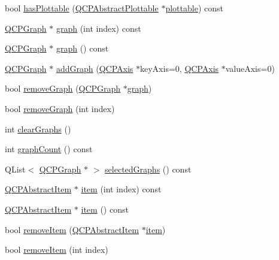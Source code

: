 \begin{DoxyCompactItemize}
\item 
bool \hyperlink{class_q_custom_plot_a72cefbfbb9e699940e37be605bd9c51e}{has\+Plottable} (\hyperlink{class_q_c_p_abstract_plottable}{Q\+C\+P\+Abstract\+Plottable} $\ast$\hyperlink{class_q_custom_plot_a32de81ff53e263e785b83b52ecd99d6f}{plottable}) const
\item 
\hyperlink{class_q_c_p_graph}{Q\+C\+P\+Graph} $\ast$ \hyperlink{class_q_custom_plot_a6ecae130f684b25276fb47bd3a5875c6}{graph} (int index) const
\item 
\hyperlink{class_q_c_p_graph}{Q\+C\+P\+Graph} $\ast$ \hyperlink{class_q_custom_plot_aac190865a67f19af3fdf2136774997af}{graph} () const
\item 
\hyperlink{class_q_c_p_graph}{Q\+C\+P\+Graph} $\ast$ \hyperlink{class_q_custom_plot_a6fb2873d35a8a8089842d81a70a54167}{add\+Graph} (\hyperlink{class_q_c_p_axis}{Q\+C\+P\+Axis} $\ast$key\+Axis=0, \hyperlink{class_q_c_p_axis}{Q\+C\+P\+Axis} $\ast$value\+Axis=0)
\item 
bool \hyperlink{class_q_custom_plot_a903561be895fb6528a770d66ac5e6713}{remove\+Graph} (\hyperlink{class_q_c_p_graph}{Q\+C\+P\+Graph} $\ast$\hyperlink{class_q_custom_plot_a6ecae130f684b25276fb47bd3a5875c6}{graph})
\item 
bool \hyperlink{class_q_custom_plot_a9554b3d2d5b10c0f884bd4010b6c192c}{remove\+Graph} (int index)
\item 
int \hyperlink{class_q_custom_plot_ab0f3abff2d2f7df3668b5836f39207fa}{clear\+Graphs} ()
\item 
int \hyperlink{class_q_custom_plot_a5e1787cdde868c4d3790f9ebc8207d90}{graph\+Count} () const
\item 
Q\+List$<$ \hyperlink{class_q_c_p_graph}{Q\+C\+P\+Graph} $\ast$ $>$ \hyperlink{class_q_custom_plot_ad3547aded026d8a9ae6ef13a69080d06}{selected\+Graphs} () const
\item 
\hyperlink{class_q_c_p_abstract_item}{Q\+C\+P\+Abstract\+Item} $\ast$ \hyperlink{class_q_custom_plot_ac042f2e78edd228ccf2f26b7fe215239}{item} (int index) const
\item 
\hyperlink{class_q_c_p_abstract_item}{Q\+C\+P\+Abstract\+Item} $\ast$ \hyperlink{class_q_custom_plot_a12eb2a283cf10a8a9176c01c0443e83e}{item} () const
\item 
bool \hyperlink{class_q_custom_plot_ae04446557292551e8fb6e2c106e1848d}{remove\+Item} (\hyperlink{class_q_c_p_abstract_item}{Q\+C\+P\+Abstract\+Item} $\ast$\hyperlink{class_q_custom_plot_ac042f2e78edd228ccf2f26b7fe215239}{item})
\item 
bool \hyperlink{class_q_custom_plot_abcfdda3d601c0441cab136137d715dea}{remove\+Item} (int index)

\end{DoxyCompactItemize}
